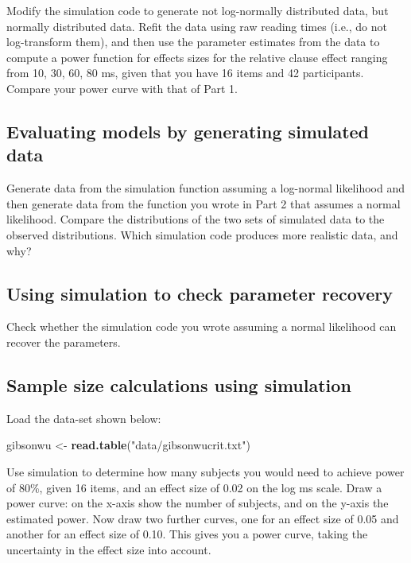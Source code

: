 \documentclass[12pt,]{krantz}
\newenvironment{Shaded}{\begin{snugshade}}{\end{snugshade}}
\newcommand{\KeywordTok}[1]{\textcolor[rgb]{0.13,0.29,0.53}{\textbf{#1}}}
\newcommand{\NormalTok}[1]{#1}
\newcommand{\StringTok}[1]{\textcolor[rgb]{0.31,0.60,0.02}{#1}}
\begin{document}
Modify the simulation code to generate not log-normally distributed data, but normally distributed data. Refit the \citet{grodner} data using raw reading times (i.e., do not log-transform them), and then use the parameter estimates from the data to compute a power function for effects sizes for the relative clause effect ranging from 10, 30, 60, 80 ms, given that you have 16 items and 42 participants. Compare your power curve with that of Part 1.

\hypertarget{sec:SimulationexercisesPart3}{%
\subsection{Evaluating models by generating simulated data}\label{sec:SimulationexercisesPart3}}

Generate data from the simulation function assuming a log-normal likelihood and then generate data from the function you wrote in Part 2 that assumes a normal likelihood. Compare the distributions of the two sets of simulated data to the observed distributions. Which simulation code produces more realistic data, and why?

\hypertarget{sec:SimulationexercisesPart4}{%
\subsection{Using simulation to check parameter recovery}\label{sec:SimulationexercisesPart4}}

Check whether the simulation code you wrote assuming a normal likelihood can recover the parameters.

\hypertarget{sec:SimulationexercisesPart5}{%
\subsection{Sample size calculations using simulation}\label{sec:SimulationexercisesPart5}}

Load the data-set shown below:

\begin{Shaded}
\begin{Highlighting}[]
\NormalTok{gibsonwu <-}\StringTok{ }\KeywordTok{read.table}\NormalTok{(}\StringTok{"data/gibsonwucrit.txt"}\NormalTok{)}
\end{Highlighting}
\end{Shaded}

Use simulation to determine how many subjects you would need to achieve power of 80\%, given 16 items, and an effect size of 0.02 on the log ms scale. Draw a power curve: on the x-axis show the number of subjects, and on the y-axis the estimated power. Now draw two further curves, one for an effect size of 0.05 and another for an effect size of 0.10. This gives you a power curve, taking the uncertainty in the effect size into account.
\end{document}
